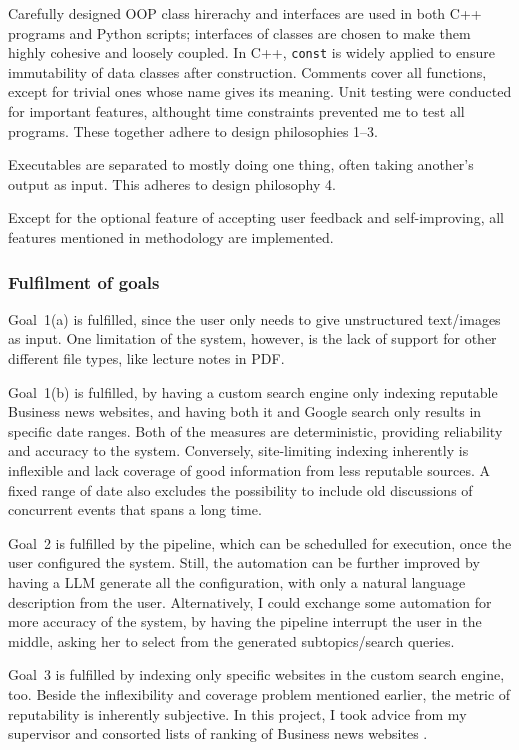 \documentclass[final-report]{report-template}
\begin{document}
Carefully designed OOP class hirerachy and interfaces are used in both C++
programs and Python scripts; interfaces of classes are chosen to make them
highly cohesive and loosely coupled. In C++, \texttt{const} is widely applied
to ensure immutability of data classes after construction. Comments cover all
functions, except for trivial ones whose name gives its meaning. Unit testing
were conducted for important features, althought time constraints prevented me
to test all programs. These together adhere to design philosophies 1--3.

Executables are separated to mostly doing one thing, often taking another's
output as input. This adheres to design philosophy 4.

Except for the optional feature of accepting user feedback and self-improving,
all features mentioned in methodology are implemented. 

\subsubsection{Fulfilment of goals}
Goal~1(a) is fulfilled, since the user only needs to give unstructured
text/images as input. One limitation of the system, however, is the lack of
support for other different file types, like lecture notes in PDF.

Goal~1(b) is fulfilled, by having a custom search engine only indexing
reputable Business news websites, and having both it and Google search only
results in specific date ranges. Both of the measures are deterministic,
providing reliability and accuracy to the system. Conversely, site-limiting
indexing inherently is inflexible and lack coverage of good information from
less reputable sources. A fixed range of date also excludes the possibility to
include old discussions of concurrent events that spans a long time.

Goal~2 is fulfilled by the pipeline, which can be schedulled for execution,
once the user configured the system. Still, the automation can be further
improved by having a LLM generate all the configuration, with only a natural
language description from the user. Alternatively, I could exchange some
automation for more accuracy of the system, by having the pipeline interrupt
the user in the middle, asking her to select from the generated
subtopics/search queries.

Goal~3 is fulfilled by indexing only specific websites in the custom search
engine, too. Beside the inflexibility and coverage problem mentioned earlier,
the metric of reputability is inherently subjective. In this project, I took
advice from my supervisor and consorted lists of ranking of Business news
websites \cite{business.news.ranking.1, business.news.ranking.2}.
\end{document}
